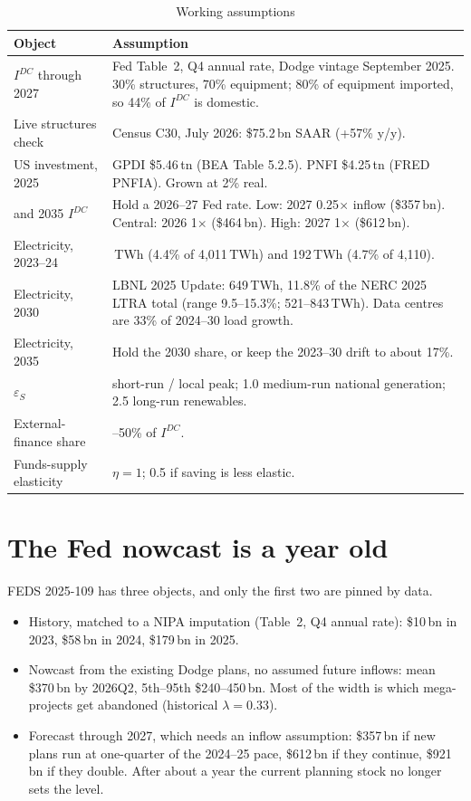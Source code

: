 \documentclass[11pt]{article}
\begin{document}
\begin{table}[H]
\centering
\caption{Working assumptions}
\label{tab:assumptions}
\begin{tabular}{>{\raggedright\arraybackslash}p{}
>{\raggedright\arraybackslash}p{}}
\toprule
Object & Assumption \\
\midrule
$I^{DC}$ through 2027 & Fed Table~2, Q4 annual rate, Dodge vintage
September 2025. 30\% structures, 70\% equipment; 80\% of equipment imported,
so 44\% of $I^{DC}$ is domestic. \\
Live structures check & Census C30, July 2026: \$75.2\,bn SAAR
(+57\% y/y). \\
US investment, 2025 & GPDI \$5.46\,tn (BEA Table 5.2.5). PNFI \$4.25\,tn
(FRED PNFIA). Grown at 2\% real. \\
2030 and 2035 $I^{DC}$ & Hold a 2026--27 Fed rate. Low: 2027 0.25$\times$
inflow (\$357\,bn). Central: 2026 1$\times$ (\$464\,bn). High: 2027
1$\times$ (\$612\,bn). \\
Electricity, 2023--24 & 176\,TWh (4.4\% of 4{,}011\,TWh) and 192\,TWh
(4.7\% of 4{,}110). \\
Electricity, 2030 & LBNL 2025 Update: 649\,TWh, 11.8\% of the NERC 2025
LTRA total (range 9.5--15.3\%; 521--843\,TWh). Data centres are 33\% of
2024--30 load growth. \\
Electricity, 2035 & Hold the 2030 share, or keep the 2023--30 drift to
about 17\%. \\
$\varepsilon_S$ & 0.3 short-run / local peak; 1.0 medium-run national
generation; 2.5 long-run renewables. \\
External-finance share & 30--50\% of $I^{DC}$. \\
Funds-supply elasticity & $\eta=1$; 0.5 if saving is less elastic. \\
\bottomrule
\end{tabular}
\end{table}

\section{The Fed nowcast is a year old}

FEDS 2025-109 has three objects, and only the first two are pinned by data.

\begin{itemize}
\item History, matched to a NIPA imputation (Table~2, Q4 annual rate):
\$10\,bn in 2023, \$58\,bn in 2024, \$179\,bn in 2025.
\item Nowcast from the existing Dodge plans, no assumed future inflows:
mean \$370\,bn by 2026Q2, 5th--95th \$240--450\,bn. Most of the width is
which mega-projects get abandoned (historical $\lambda=0.33$).
\item Forecast through 2027, which needs an inflow assumption: \$357\,bn
if new plans run at one-quarter of the 2024--25 pace, \$612\,bn if they
continue, \$921\,bn if they double. After about a year the current planning
stock no longer sets the level.
\end{itemize}
\end{document}
